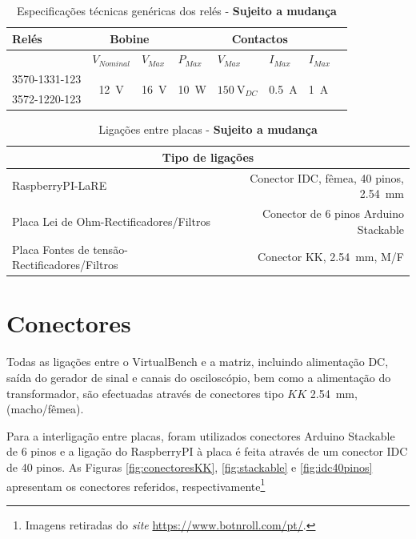 \documentclass[a4paper,oneside,final,twocolumn]{article}
\begin{document}
\begin{table}[htb]
\caption{Especificações técnicas genéricas dos relés - \textbf{Sujeito a mudança}}
\centering
\begin{tabular}{lcclllll}
\toprule
Relés & \multicolumn{2}{c}{Bobine} & \multicolumn{5}{c}{Contactos}\\
\midrule
& \multicolumn{1}{l}{$V_{Nominal}$} & \multicolumn{1}{l}{$V_{Max}$} & $P_{Max}$ & $V_{Max}$ & $I_{Max}$ & $I_{Max}$\\
\midrule
3570-1331-123  & \multirow{2}{*}{\SI{12}{\volt}} & \multirow{2}{*}{\SI{16}{\volt}}  & \multirow{2}{*}{\SI{10}{\watt}} & \multirow{2}{*}{$\SI{150}{\volt}_{DC}$} & \multirow{2}{*}{\SI{0.5}{\ampere}} & \multirow{2}{*}{\SI{1}{\ampere}}\\
3572-1220-123 & & & & & & &\\                
\bottomrule
\end{tabular}%
\end{table}

\begin{table}[htb]
\caption{Ligações entre placas - \textbf{Sujeito a mudança}}
\label{Table:ligacoesplacas}
\centering
\begin{tabular}{lr}
\toprule
\multicolumn{2}{c}{Tipo de ligações}\\
\midrule
RaspberryPI-LaRE & Conector IDC, fêmea, 40 pinos, \SI{2.54}{\mm}\\
Placa Lei de Ohm-Rectificadores/Filtros & Conector de 6 pinos Arduino Stackable\\
Placa Fontes de tensão-Rectificadores/Filtros &  Conector KK, \SI{2.54}{\mm}, M/F \\
\bottomrule
\end{tabular}
\end{table}

\section{Conectores}
Todas as ligações entre o VirtualBench e a matriz, incluindo alimentação DC, saída do gerador de sinal e canais do osciloscópio, bem como a alimentação do transformador, são efectuadas através de conectores tipo $KK$ \SI{2,54}{\mm}, (macho/fêmea).

Para a interligação entre placas, foram utilizados conectores Arduino Stackable de 6 pinos e a ligação do RaspberryPI à placa é feita através de um conector IDC de 40 pinos. As Figuras \ref{fig:conectoresKK}, \ref{fig:stackable} e \ref{fig:idc40pinos} apresentam os conectores referidos, respectivamente\footnote{Imagens retiradas do \textit{site} \href{https://www.botnroll.com/pt//}{https://www.botnroll.com/pt/}.}
\end{document}
